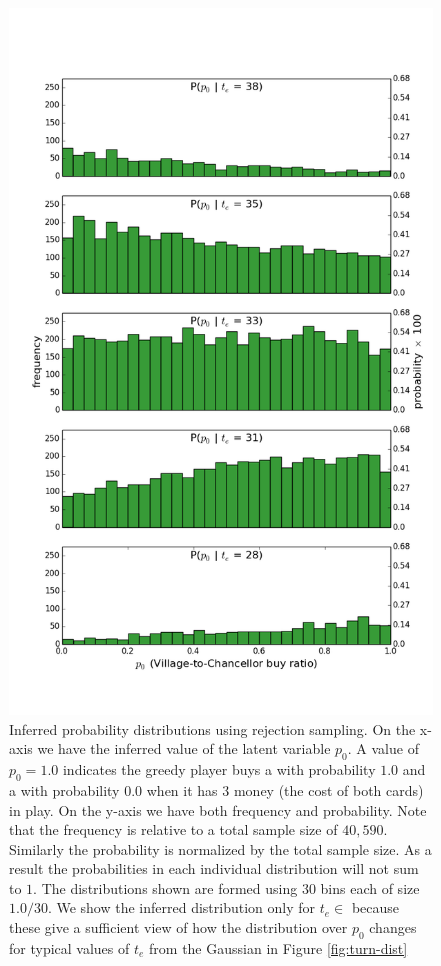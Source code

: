 \begin{figure}
\includegraphics[width=1.0\columnwidth]{../3-row-dist.png}
\caption{\label{fig:rejection-sampling} Inferred probability distributions
using rejection sampling. On the x-axis we have the inferred value of the
latent variable $p_0$. A value of $p_0 = 1.0$ indicates the greedy player
buys a  with probability $1.0$ and a  with
probability $0.0$ when it has $3$ money (the cost of both cards) in play.
On the y-axis we have both frequency and probability. Note that the frequency
is relative to a total sample size of $40,590$. Similarly the probability is
normalized by the total sample size. As a result the probabilities in each
individual distribution will not sum to $1$. The distributions shown are formed
using $30$ bins each of size $1.0 / 30$. We show the inferred distribution only
for $t_e \in$ \hsk{[38,35,33,31,28]} because these give a sufficient view of
how the distribution over $p_0$ changes for typical values of $t_e$ from
the Gaussian in Figure \ref{fig:turn-dist}}
\end{figure}

